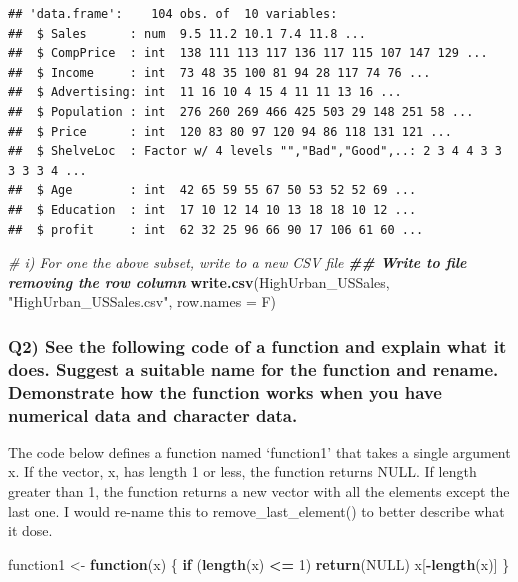 \documentclass[
]{article}
\newenvironment{Shaded}{\begin{snugshade}}{\end{snugshade}}
\newcommand{\AttributeTok}[1]{\textcolor[rgb]{0.13,0.29,0.53}{#1}}
\newcommand{\CommentTok}[1]{\textcolor[rgb]{0.56,0.35,0.01}{\textit{#1}}}
\newcommand{\ConstantTok}[1]{\textcolor[rgb]{0.56,0.35,0.01}{#1}}
\newcommand{\ControlFlowTok}[1]{\textcolor[rgb]{0.13,0.29,0.53}{\textbf{#1}}}
\newcommand{\DecValTok}[1]{\textcolor[rgb]{0.00,0.00,0.81}{#1}}
\newcommand{\DocumentationTok}[1]{\textcolor[rgb]{0.56,0.35,0.01}{\textbf{\textit{#1}}}}
\newcommand{\FunctionTok}[1]{\textcolor[rgb]{0.13,0.29,0.53}{\textbf{#1}}}
\newcommand{\NormalTok}[1]{#1}
\newcommand{\OtherTok}[1]{\textcolor[rgb]{0.56,0.35,0.01}{#1}}
\newcommand{\SpecialCharTok}[1]{\textcolor[rgb]{0.81,0.36,0.00}{\textbf{#1}}}
\newcommand{\StringTok}[1]{\textcolor[rgb]{0.31,0.60,0.02}{#1}}
\begin{document}
\begin{verbatim}
## 'data.frame':    104 obs. of  10 variables:
##  $ Sales      : num  9.5 11.2 10.1 7.4 11.8 ...
##  $ CompPrice  : int  138 111 113 117 136 117 115 107 147 129 ...
##  $ Income     : int  73 48 35 100 81 94 28 117 74 76 ...
##  $ Advertising: int  11 16 10 4 15 4 11 11 13 16 ...
##  $ Population : int  276 260 269 466 425 503 29 148 251 58 ...
##  $ Price      : int  120 83 80 97 120 94 86 118 131 121 ...
##  $ ShelveLoc  : Factor w/ 4 levels "","Bad","Good",..: 2 3 4 4 3 3 3 3 3 4 ...
##  $ Age        : int  42 65 59 55 67 50 53 52 52 69 ...
##  $ Education  : int  17 10 12 14 10 13 18 18 10 12 ...
##  $ profit     : int  62 32 25 96 66 90 17 106 61 60 ...
\end{verbatim}

\begin{Shaded}
\begin{Highlighting}[]
\CommentTok{\# i)  For one the above subset, write to a new CSV file}
    \DocumentationTok{\#\# Write to file removing the row column}
  \FunctionTok{write.csv}\NormalTok{(HighUrban\_USSales, }\StringTok{"HighUrban\_USSales.csv"}\NormalTok{, }\AttributeTok{row.names =}\NormalTok{ F)}
\end{Highlighting}
\end{Shaded}

\subsubsection{Q2) See the following code of a function and explain what
it does. Suggest a suitable name for the function and rename.
Demonstrate how the function works when you have numerical data and
character
data.}\label{q2-see-the-following-code-of-a-function-and-explain-what-it-does.-suggest-a-suitable-name-for-the-function-and-rename.-demonstrate-how-the-function-works-when-you-have-numerical-data-and-character-data.}

The code below defines a function named `function1' that takes a single
argument x. If the vector, x, has length 1 or less, the function returns
NULL. If length greater than 1, the function returns a new vector with
all the elements except the last one. I would re-name this to
remove\_last\_element() to better describe what it dose.

\begin{Shaded}
\begin{Highlighting}[]
\NormalTok{function1 }\OtherTok{\textless{}{-}} \ControlFlowTok{function}\NormalTok{(x) \{}
  \ControlFlowTok{if}\NormalTok{ (}\FunctionTok{length}\NormalTok{(x) }\SpecialCharTok{\textless{}=} \DecValTok{1}\NormalTok{) }\FunctionTok{return}\NormalTok{(}\ConstantTok{NULL}\NormalTok{)}
\NormalTok{  x[}\SpecialCharTok{{-}}\FunctionTok{length}\NormalTok{(x)]}
\NormalTok{\}}
\end{Highlighting}
\end{Shaded}
\end{document}
